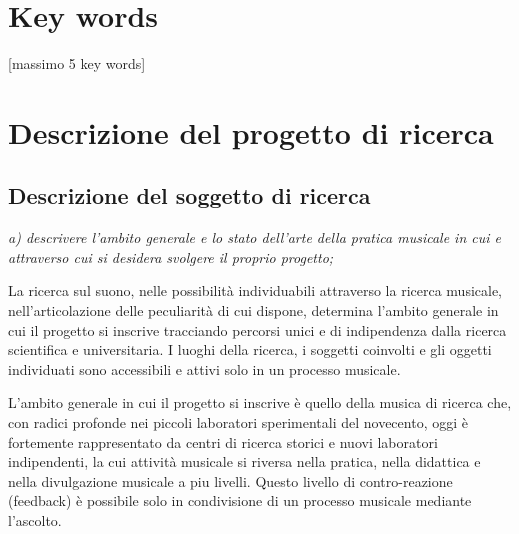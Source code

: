 \documentclass{gs-adonis}
\begin{document}
%
%


\section*{Key words}

[massimo 5 key words]


\section{Descrizione del progetto di ricerca}%

\subsection{Descrizione del soggetto di ricerca}%

\emph{a) descrivere l’ambito generale e lo stato dell’arte della pratica musicale in cui e attraverso cui si desidera svolgere il proprio progetto;}



La ricerca sul suono, nelle possibilità individuabili attraverso la ricerca
musicale, nell'articolazione delle peculiarità di cui dispone, determina
l'ambito generale in cui il progetto si inscrive tracciando percorsi unici e di
indipendenza dalla ricerca scientifica e universitaria. I luoghi della ricerca,
i soggetti coinvolti e gli oggetti individuati sono accessibili e attivi solo
in un processo musicale.

L'ambito generale in cui il progetto si inscrive è quello della musica di
ricerca che, con radici profonde nei piccoli laboratori sperimentali del
novecento, oggi è fortemente rappresentato da centri di ricerca storici e
nuovi laboratori indipendenti, la cui attività musicale si riversa nella
pratica, nella didattica e nella divulgazione musicale a piu livelli. Questo
livello di contro-reazione (feedback) è possibile solo in condivisione di un
processo musicale mediante l'ascolto.

\end{document}

